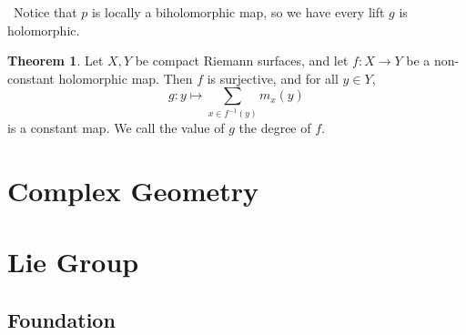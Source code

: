 \documentclass[12pt,a4paper]{book}
\newenvironment{prooff}{{\noindent\it\textcolor{cyan!40!black}{Proof}:}\,}{\par}
\theoremstyle{definition}
\newtheorem{theo}[defn]{Theorem}
\begin{document}
\begin{prooff}
    Notice that $p$ is locally a biholomorphic map, so we have every lift $g$ is holomorphic.
\end{prooff}
\begin{theo}
    Let $X, Y$ be compact Riemann surfaces, and let $f:X\rightarrow Y$ be a non-constant holomorphic map. Then $f$ is surjective, and for all $y\in Y$,
    $$
        g: y\mapsto \sum_{x\in f^{-1}(y)}m_x(y)
    $$
    is a constant map. We call the value of $g$ the degree of $f$.
\end{theo}




\chapter{Complex Geometry}


\chapter{Lie Group}
\section{Foundation}
\end{document}
